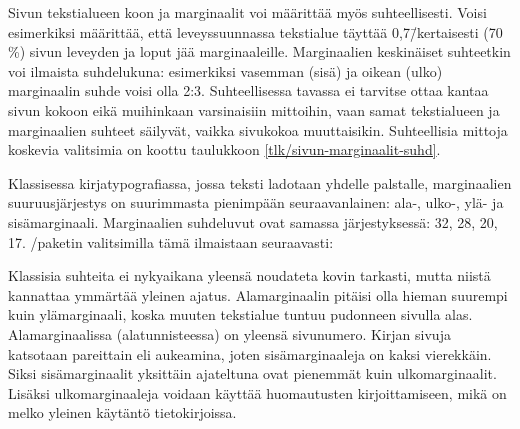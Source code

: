 Sivun tekstialueen koon ja marginaalit voi määrittää myös
suhteellisesti. Voisi esimerkiksi määrittää, että leveyssuunnassa
tekstialue täyttää 0,7\=/kertaisesti (70\,\%) sivun leveyden ja loput
jää marginaaleille. Marginaalien keskinäiset suhteetkin voi ilmaista
suhdelukuna: esimerkiksi vasemman (sisä) ja oikean (ulko) marginaalin
suhde voisi olla 2:3. Suhteellisessa tavassa ei tarvitse ottaa kantaa
sivun kokoon eikä muihinkaan varsinaisiin mittoihin, vaan samat
tekstialueen ja marginaalien suhteet säilyvät, vaikka sivukokoa
muuttaisikin. Suhteellisia mittoja koskevia valitsimia on koottu
taulukkoon \ref{tlk/sivun-marginaalit-suhd}.


Klassisessa kirjatypografiassa, jossa teksti ladotaan yhdelle palstalle,
marginaalien suuruusjärjestys on suurimmasta pienimpään seuraavanlainen:
ala-, ulko-, ylä- ja sisämarginaali. Marginaalien suhdeluvut ovat
samassa järjestyksessä: 32, 28, 20, 17. \-/paketin
valitsimilla tämä ilmaistaan seuraavasti:

\begin{koodilohkosis}
\geometry{hmarginratio=17:28, vmarginratio=20:32}
\end{koodilohkosis}

\noindent
Klassisia suhteita ei nykyaikana yleensä noudateta kovin tarkasti, mutta
niistä kannattaa ymmärtää yleinen ajatus. Alamarginaalin pitäisi olla
hieman suurempi kuin ylämarginaali, koska muuten tekstialue tuntuu
pudonneen sivulla alas. Alamarginaalissa (alatunnisteessa) on yleensä
sivunumero. Kirjan sivuja katsotaan pareittain eli aukeamina, joten
sisämarginaaleja on kaksi vierekkäin. Siksi sisämarginaalit yksittäin
ajateltuna ovat pienemmät kuin ulkomarginaalit. Lisäksi ulkomarginaaleja
voidaan käyttää huomautusten kirjoittamiseen, mikä on melko yleinen
käytäntö tietokirjoissa.


